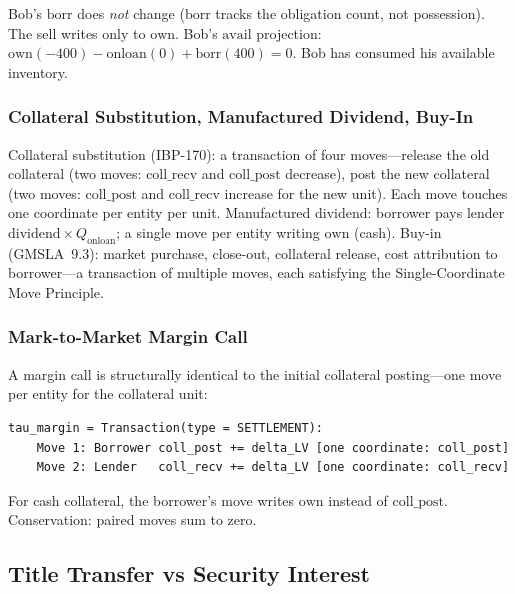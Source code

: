 \documentclass[11pt,a4paper]{article}
\begin{document}
\noindent Bob's $\mathrm{borr}$ does \emph{not} change ($\mathrm{borr}$ tracks the obligation count, not possession). The sell writes only to $\mathrm{own}$. Bob's $\mathrm{avail}$ projection: $\mathrm{own}(-400) - \mathrm{onloan}(0) + \mathrm{borr}(400) = 0$. Bob has consumed his available inventory. \checkmark

\subsubsection{Collateral Substitution, Manufactured Dividend, Buy-In}

Collateral substitution (IBP-170): a transaction of four moves---release the old collateral (two moves: $\mathrm{coll\_recv}$ and $\mathrm{coll\_post}$ decrease), post the new collateral (two moves: $\mathrm{coll\_post}$ and $\mathrm{coll\_recv}$ increase for the new unit). Each move touches one coordinate per entity per unit. Manufactured dividend: borrower pays lender $\text{dividend} \times Q_{\mathrm{onloan}}$; a single move per entity writing $\mathrm{own}$ (cash). Buy-in (GMSLA~9.3): market purchase, close-out, collateral release, cost attribution to borrower---a transaction of multiple moves, each satisfying the Single-Coordinate Move Principle.

\subsubsection{Mark-to-Market Margin Call}

A margin call is structurally identical to the initial collateral posting---one move per entity for the collateral unit:

\begin{lstlisting}
tau_margin = Transaction(type = SETTLEMENT):
    Move 1: Borrower coll_post += delta_LV [one coordinate: coll_post]
    Move 2: Lender   coll_recv += delta_LV [one coordinate: coll_recv]
\end{lstlisting}

\noindent For cash collateral, the borrower's move writes $\mathrm{own}$ instead of $\mathrm{coll\_post}$. Conservation: paired moves sum to zero. \checkmark

\subsection{Title Transfer vs Security Interest}
\label{sec:sbl-title-transfer}
\end{document}

